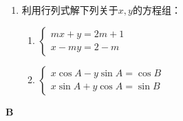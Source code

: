 \begin{enumerate}
  \item 利用行列式解下列关于$x,y$的方程组：
\begin{multicols}{2}
\begin{enumerate}[(1)]
  \item $\begin{cases}
    mx+y=2m+1\\x-my=2-m
  \end{cases}$
  \item $\begin{cases}
   x\cos A-y\sin A=\cos B\\
   x\sin A +y\cos A=\sin B
  \end{cases}$
\end{enumerate}
\end{multicols}
\end{enumerate}

\begin{center}
  \bfseries B
\end{center}

